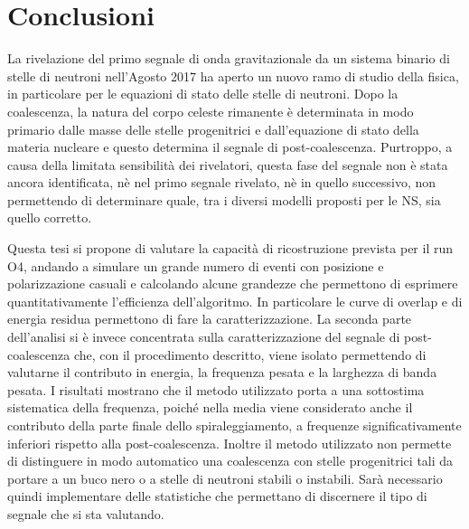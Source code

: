 \chapter{Conclusioni}
\label{chapter:conclusioni}
La rivelazione del primo segnale di onda gravitazionale da un sistema binario di stelle di neutroni nell'Agosto 2017 ha aperto un nuovo ramo di studio della fisica, in particolare per le equazioni di stato delle stelle di neutroni. Dopo la coalescenza, la natura del corpo celeste rimanente è determinata in modo primario dalle masse delle stelle progenitrici e dall'equazione di stato della materia nucleare e questo determina il segnale di post-coalescenza. Purtroppo, a causa della limitata sensibilità dei rivelatori, questa fase del segnale non è stata ancora identificata, nè nel primo segnale rivelato, nè in quello successivo, non permettendo di determinare quale, tra i diversi modelli proposti per le NS, sia quello corretto.

Questa tesi si propone di valutare la capacità di ricostruzione prevista per il run O4, andando a simulare un grande numero di eventi con posizione e polarizzazione casuali e calcolando alcune grandezze che permettono di esprimere quantitativamente l'efficienza dell'algoritmo. In particolare le curve di overlap e di energia residua permettono di fare la caratterizzazione.
La seconda parte dell'analisi si è invece concentrata sulla caratterizzazione del segnale di post-coalescenza che, con il procedimento descritto, viene isolato permettendo di valutarne il contributo in energia, la frequenza pesata e la larghezza di banda pesata. I risultati mostrano che il metodo utilizzato porta a una sottostima sistematica della frequenza, poiché nella media viene considerato anche il contributo della parte finale dello spiraleggiamento, a frequenze significativamente inferiori rispetto alla post-coalescenza. Inoltre il metodo utilizzato non permette di distinguere in modo automatico una coalescenza con stelle progenitrici tali da portare a un buco nero o a stelle di neutroni stabili o instabili. Sarà necessario quindi implementare delle statistiche che permettano di discernere il tipo di segnale che si sta valutando.